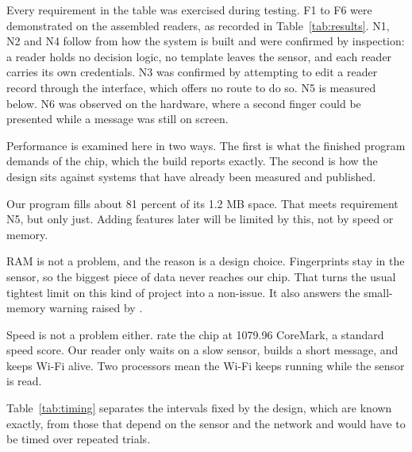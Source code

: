 Every requirement in the table was exercised during testing. F1 to F6 were
demonstrated on the assembled readers, as recorded in
Table~\ref{tab:results}. N1, N2 and N4 follow from how the system is built and
were confirmed by inspection: a reader holds no decision logic, no template
leaves the sensor, and each reader carries its own credentials. N3 was confirmed
by attempting to edit a reader record through the interface, which offers no
route to do so. N5 is measured below. N6 was observed on the hardware, where a
second finger could be presented while a message was still on screen.


Performance is examined here in two ways. The first is what the finished program
demands of the chip, which the build reports exactly. The second is how the
design sits against systems that have already been measured and published.


Our program fills about 81 percent of its 1.2 MB space. That meets requirement
N5, but only just. Adding features later will be limited by this, not by speed
or memory.

RAM is not a problem, and the reason is a design choice. Fingerprints stay in
the sensor, so the biggest piece of data never reaches our chip. That turns the
usual tightest limit on this kind of project into a non-issue. It also answers
the small-memory warning raised by \textcite{rahman2026}.

Speed is not a problem either. \textcite{espressif2025} rate the chip at 1079.96
CoreMark, a standard speed score. Our reader only waits on a slow sensor, builds
a short message, and keeps Wi-Fi alive. Two processors mean the Wi-Fi keeps
running while the sensor is read.


Table~\ref{tab:timing} separates the intervals fixed by the design, which are
known exactly, from those that depend on the sensor and the network and would
have to be timed over repeated trials.

